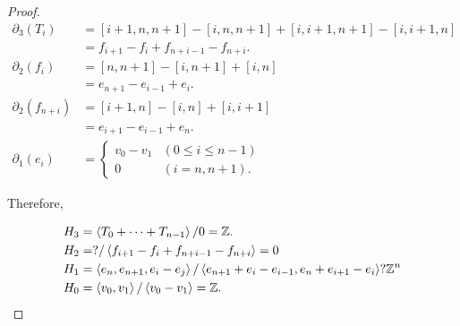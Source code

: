 \documentclass[12pt, psamsfonts]{amsart}
\theoremstyle{definition}
\theoremstyle{remark}
\numberwithin{equation}{section}
\begin{document}
\begin{proof}
  \begin{align*}
    \partial_3(T_i)
      &= [i + 1, n, n + 1] - [i, n, n + 1] + [i, i + 1, n + 1] - [i, i + 1, n] \\
      &= f_{i + 1} - f_i + f_{n + i - 1} - f_{n + i}. \\
    \partial_2(f_i)
      &= [n, n + 1] - [i, n + 1] + [i, n] \\
      &= e_{n + 1} - e_{i - 1} + e_i. \\
    \partial_2(f_{n + i})
      &= [i + 1, n] - [i, n] + [i, i + 1] \\
      &= e_{i + 1} - e_{i - 1} + e_n. \\
    \partial_1(e_i) &= \begin{cases}
      v_0 - v_1 & (0 \leq i \leq n - 1) \\
      0 & (i = n, n + 1).
    \end{cases} 
  \end{align*}

  Therefore,

  \begin{align*}
    H_3 &= \ev{ T_0 + \cdots + T_{n - 1} } / 0 = \mathbb{Z}. \\
    H_2 &= ? / \ev{ f_{i + 1} - f_i + f_{n + i - 1} - f_{n + i} } = 0 \\
    H_1 &= \ev{ e_n, e_{n + 1}, e_i - e_j } / \ev{ e_{n + 1} + e_i - e_{i - 1}, e_n + e_{i + 1} - e_i } ? \mathbb{Z}^n \\
    H_0 &= \ev{ v_0, v_1 } / \ev{ v_0 - v_1 } = \mathbb{Z}.
  \end{align*}

\end{proof}
\end{document}
